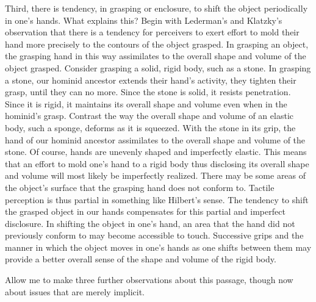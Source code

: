 Third, there is tendency, in grasping or enclosure, to shift the object periodically in one's hands. What explains this? Begin with Lederman's and Klatzky's \citeyearpar{Lederman:1987fr} observation that there is a tendency for perceivers to exert effort to mold their hand more precisely to the contours of the object grasped. In grasping an object, the grasping hand in this way assimilates to the overall shape and volume of the object grasped. Consider grasping a solid, rigid body, such as a stone. In grasping a stone, our hominid ancestor extends their hand's activity, they tighten their grasp, until they can no more. Since the stone is solid, it resists penetration. Since it is rigid, it maintains its overall shape and volume even when in the hominid's grasp. Contrast the way the overall shape and volume of an elastic body, such a sponge, deforms as it is squeezed. With the stone in its grip, the hand of our hominid ancestor assimilates to the overall shape and volume of the stone. Of course, hands are unevenly shaped and imperfectly elastic. This means that an effort to mold one's hand to a rigid body thus disclosing its overall shape and volume will most likely be imperfectly realized. There may be some areas of the object's surface that the grasping hand does not conform to. Tactile perception is thus partial in something like Hilbert's \citeyearpar{Hilbert:1987jq} sense. The tendency to shift the grasped object in our hands compensates for this partial and imperfect disclosure. In shifting the object in one's hand, an area that the hand did not previously conform to may become accessible to touch. Successive grips and the manner in which the object moves in one's hands as one shifts between them may provide a better overall sense of the shape and volume of the rigid body. 

Allow me to make three further observations about this passage, though now about issues that are merely implicit.


